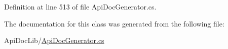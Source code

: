 Definition at line 513 of file Api\+Doc\+Generator.\+cs.



The documentation for this class was generated from the following file\+:\begin{DoxyCompactItemize}
\item 
Api\+Doc\+Lib/\hyperlink{_api_doc_generator_8cs}{Api\+Doc\+Generator.\+cs}\end{DoxyCompactItemize}
